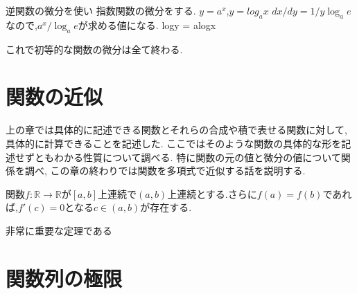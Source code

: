 \begin{prop}[指数関数の微分]
逆関数の微分を使い
指数関数の微分をする.
$y= a^x$,$y= log_ax$
$dx/dy = 1/y \log_ae$なので,$a^x/\log_ae$が求める値になる.
logy = alogx
\end{prop}

これで初等的な関数の微分は全て終わる.

\section{関数の近似}
上の章では具体的に記述できる関数とそれらの合成や積で表せる関数に対して,具体的に計算できることを記述した.
ここではそのような関数の具体的な形を記述せずともわかる性質について調べる.
特に関数の元の値と微分の値について関係を調べ,
この章の終わりでは関数を多項式で近似する話を説明する.

\begin{thm}[ロルの定理]
関数$f: \mathbb{R} \to \mathbb{R}$が$[a, b]$上連続で$(a, b)$上連続とする.さらに$f(a) = f(b)$であれば,$f'(c) = 0$となる$c \in (a,b)$が存在する.
\end{thm}
非常に重要な定理である

\begin{thm}[平均値の定理]

\end{thm}

\begin{thm}[テイラーの定理]

\end{thm}

\begin{thm}[ロピタルの定理]

\end{thm}

\section{関数列の極限}